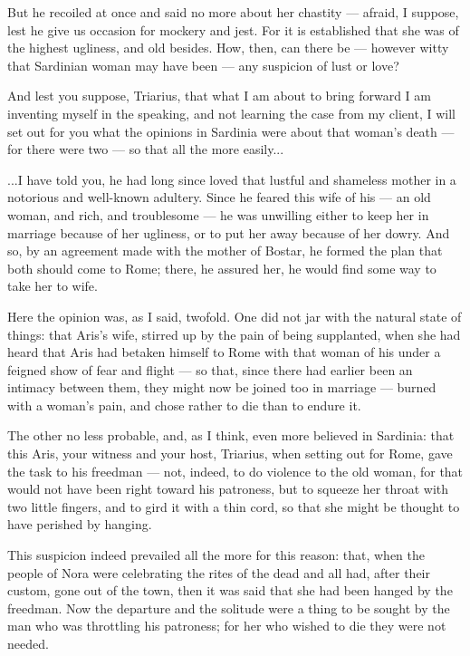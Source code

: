  But he recoiled at once and said no more about her chastity --- afraid, I suppose, lest he give us occasion for mockery and jest. For it is established that she was of the highest ugliness, and old besides. How, then, can there be --- however witty that Sardinian woman may have been --- any suspicion of lust or love?

 And lest you suppose, Triarius, that what I am about to bring forward I am inventing myself in the speaking, and not learning the case from my client, I will set out for you what the opinions in Sardinia were about that woman's death --- for there were two --- so that all the more easily...

 ...I have told you, he had long since loved that lustful and shameless mother in a notorious and well-known adultery. Since he feared this wife of his --- an old woman, and rich, and troublesome --- he was unwilling either to keep her in marriage because of her ugliness, or to put her away because of her dowry. And so, by an agreement made with the mother of Bostar, he formed the plan that both should come to Rome; there, he assured her, he would find some way to take her to wife.

 Here the opinion was, as I said, twofold. One did not jar with the natural state of things: that Aris's wife, stirred up by the pain of being supplanted, when she had heard that Aris had betaken himself to Rome with that woman of his under a feigned show of fear and flight --- so that, since there had earlier been an intimacy between them, they might now be joined too in marriage --- burned with a woman's pain, and chose rather to die than to endure it.

 The other no less probable, and, as I think, even more believed in Sardinia: that this Aris, your witness and your host, Triarius, when setting out for Rome, gave the task to his freedman --- not, indeed, to do violence to the old woman, for that would not have been right toward his patroness, but to squeeze her throat with two little fingers, and to gird it with a thin cord, so that she might be thought to have perished by hanging.

 This suspicion indeed prevailed all the more for this reason: that, when the people of Nora were celebrating the rites of the dead and all had, after their custom, gone out of the town, then it was said that she had been hanged by the freedman. Now the departure and the solitude were a thing to be sought by the man who was throttling his patroness; for her who wished to die they were not needed.

